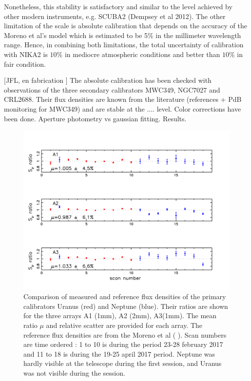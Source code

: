 \documentclass[]{aa} %
\begin{document}
Nonetheless, this stability is satisfactory and similar to the level achieved by other modern instruments, e.g. SCUBA2 (Dempsey et al 2012).
The other limitation of the scale is absolute calibration that depends on the
accuracy of the Moreno et al's model which is estimated to be 5\% in the millimeter wavelength range. Hence, in combining both limitations,
the total uncertainty of calibration with NIKA2 is $10\%$ in mediocre atmospheric conditions and better than $10\%$ in fair condition. 

[JFL, en fabrication ] The absolute calibration has been checked with observations of the three secondary calibrators MWC349, NGC7027 and CRL2688.
Their flux densities are known from the literature (references + PdB monitoring for MWC349) and are stable at the .... level.
Color corrections have been done. Aperture photometry vs gaussian fitting. Results.


\begin{figure}[h]
   \centering
    \includegraphics[angle=0,width=1.0\linewidth]{Ura_Nept_r9_10.pdf}     
    \caption{Comparison of  measured and reference flux densities of the primary calibrators Uranus (red) and Neptune (blue).
       Their ratios are shown for the three arrays A1 (1mm), A2 (2mm), A3(1mm).
      The mean ratio $\mu$ and relative scatter are provided for each array. The reference flux densities are from the Moreno et al ( ). 
      Scan numbers are time ordered : 1 to 10 is during the period 23-28 february 2017 and 11 to 18
      is during the  19-25 april 2017 period. Neptune was hardly visible at the telescope during the first session,
      and Uranus was not visible during the session.}
         \label{fig:calibaccuracy}
\end{figure}
\end{document}
